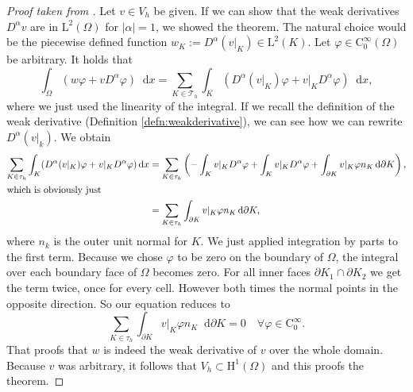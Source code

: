 \documentclass[12pt,a4paper,twoside, open=right]{scrreprt}
\theoremstyle{definition}
\theoremstyle{plain}
\newcommand{\abs}[1]{\left\vert #1\right\vert}
\newcommand{\D}{\mathop{}\!\mathrm{d}}
\begin{document}
\begin{proof}[Proof taken from \cite{Ganesan2017}]
    Let $v\in V_h$ be given. If we can show that the weak derivatives $D^\alpha v$ are in $ \mathrm{L}^2(\Omega)$ for $\abs{\alpha}=1$, we showed the theorem. The natural choice would be the piecewise defined function $w_K:=D^\alpha(v\vert_K)\in \mathrm{L}^2(K)$. Let $\varphi\in \mathrm{C}^\infty_0(\Omega)$ be arbitrary. It holds that 
    \begin{equation}
        \int_\Omega(w\varphi+vD^\alpha \varphi)\D x = \sum_{K\in\mathcal{T}_h}\int_K(D^\alpha(v\vert_K)\varphi+v\vert_K D^\alpha\varphi)\D x,
    \end{equation}
    where we just used the linearity of the integral. If we recall the definition of the weak derivative (Definition \ref{defn:weakderivative}), we can see how we can rewrite $D^\alpha(v\vert_k)$. We obtain
    \begin{align}
        \sum_{K\in\tau_h}\int_K(D^\alpha(v\vert_K)\varphi+v\vert_K D^\alpha\varphi)\D x&=\sum_{K\in\tau_h}\left(-\int_K v\vert_KD^\alpha\varphi+\int_K v\vert_K D^\alpha\varphi +\int_{\partial K}v\vert_K\varphi n_K\D\partial K\right),\\\intertext{which is obviously just}& =\sum_{K\in\tau_h}\int_{\partial K}v\vert_K\varphi n_K\D\partial K,
    \end{align}
    where $n_k$ is the outer unit normal for $K$. We just applied integration by parts to the first term. Because we chose $\varphi$ to be zero on the boundary of $\Omega$, the integral over each boundary face of $\Omega$ becomes zero. For all inner faces $\partial K_1\cap \partial K_2$ we get the term twice, once for every cell. However both times the normal points in the opposite direction. So our equation reduces to 
    \begin{equation}
        \sum_{K\in\tau_h}\int_{\partial K}v\vert_K\varphi n_K\D\partial K=0 \quad \forall\varphi\in \mathrm{C}^\infty_0.
    \end{equation}
    That proofs that $w$ is indeed the weak derivative of $v$ over the whole domain. Because $v$ was arbitrary, it follows that $V_h\subset \mathrm{H}^1(\Omega)$ and this proofs the theorem.
\end{proof}
\end{document}
